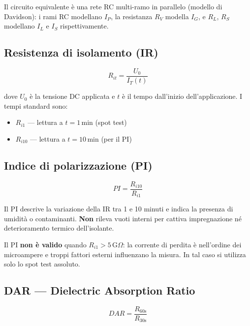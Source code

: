 \documentclass[a4paper,11pt]{article}
\begin{document}
Il circuito equivalente è una rete RC multi-ramo in parallelo (modello di Davidson): i rami RC modellano $I_P$, la resistanza $R_V$ modella $I_G$, e $R_L$, $R_S$ modellano $I_L$ e $I_S$ rispettivamente.

\subsection{Resistenza di isolamento (IR)}

\begin{equation}
  R_{it} = \frac{U_0}{I_T(t)}
\end{equation}

dove $U_0$ è la tensione DC applicata e $t$ è il tempo dall'inizio dell'applicazione. I tempi standard sono:

\begin{itemize}
  \item $R_{i1}$ — lettura a $t = 1\,\text{min}$ (spot test)
  \item $R_{i10}$ — lettura a $t = 10\,\text{min}$ (per il PI)
\end{itemize}

\subsection{Indice di polarizzazione (PI)}

\begin{equation}
  \boxed{PI = \frac{R_{i10}}{R_{i1}}}
\end{equation}

Il PI descrive la variazione della IR tra 1 e 10 minuti e indica la presenza di umidità o contaminanti. \textbf{Non} rileva vuoti interni per cattiva impregnazione né deterioramento termico dell'isolante.

\begin{notabox}
Il PI \textbf{non è valido} quando $R_{i1} > 5\,\text{G}\Omega$: la corrente di perdita è nell'ordine dei microampere e troppi fattori esterni influenzano la misura. In tal caso si utilizza solo lo spot test assoluto.
\end{notabox}

\subsection{DAR — Dielectric Absorption Ratio}

\begin{equation}
  DAR = \frac{R_{60\text{s}}}{R_{30\text{s}}}
\end{equation}
\end{document}
